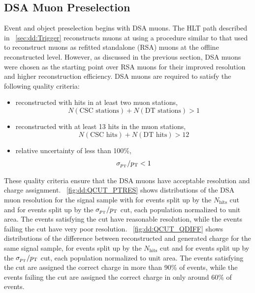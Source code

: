 \subsection{DSA Muon Preselection}
\label{sec:dd:DSAQuality}
Event and object preselection begins with DSA muons.
The HLT path described in \Sec~\ref{sec:dd:Trigger} reconstructs muons at \Ltwo using a procedure similar to that used to reconstruct muons as refitted standalone (RSA) muons at the offline reconstructed level.
However, as discussed in the previous section, DSA muons were chosen as the starting point over RSA muons for their improved \pT resolution and higher reconstruction efficiency.
DSA muons are required to satisfy the following quality criteria:
\begin{itemize}
  \item reconstructed with hits in at least two muon stations, \ie $$N(\text{CSC stations}) + N(\text{DT stations}) > 1$$
  \item reconstructed with at least 13 hits in the muon stations, \ie $$N(\text{CSC hits}) + N(\text{DT hits}) > 12$$
  \item relative \pT uncertainty of less than 100\%, \ie $$\sigma_{p_{\mathrm{T}}}/p_{\mathrm{T}} < 1$$
\end{itemize}

These quality criteria ensure that the DSA muons have acceptable \pT resolution and charge assignment.
\Fig~\ref{fig:dd:QCUT_PTRES} shows distributions of the DSA muon \pT resolution for the \twoMu signal sample with  for events split up by the $N_\text{hits}$ cut and for events split up by the $\sigma_{p_{\mathrm{T}}}/p_{\mathrm{T}}$ cut, each population normalized to unit area.
The events satisfying the cut have reasonable \pT resolution, while the events failing the cut have very poor \pT resolution.
\Fig~\ref{fig:dd:QCUT_QDIFF} shows distributions of the difference between reconstructed and generated charge for the same signal sample, for events split up by the $N_\text{hits}$ cut and for events split up by the $\sigma_{p_{\mathrm{T}}}/p_{\mathrm{T}}$ cut, each population normalized to unit area.
The events satisfying the cut are assigned the correct charge in more than 90\% of events, while the events failing the cut are assigned the correct charge in only around 60\% of events.

